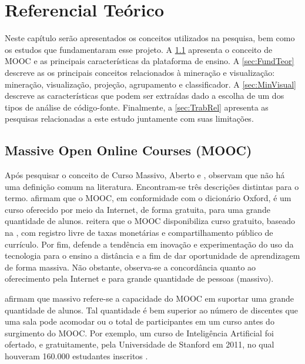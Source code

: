 \chapter{Referencial Teórico}
\label{chap:Ref}
	Neste capítulo serão apresentados os conceitos utilizados na pesquisa, bem como
	os estudos que fundamentaram esse projeto. A \cref{sec:Mooc} apresenta
	o conceito de MOOC e as principais características da plataforma de ensino.
	A \cref{sec:FundTeor} descreve as os principais conceitos relacionados à
	mineração e visualização: mineração, visualização, projeção, agrupamento e
	classificador. A \cref{sec:MinVisual} descreve as características que
	podem ser extraídas dado a escolha de um dos tipos de análise de código-fonte.
	Finalmente, a \cref{sec:TrabRel} apresenta as pesquisas relacionadas a este estudo
	juntamente com suas limitações.

	\section{Massive Open Online Courses (MOOC)}
	\label{sec:Mooc}
		Após pesquisar o conceito de Curso Massivo, Aberto e ,
		 observam que não há uma definição comum na
		literatura. Encontram-se três descrições distintas para o termo.
		 afirmam que o MOOC, em conformidade com o
		dicionário Oxford, é um curso oferecido por meio da Internet, de forma
		gratuita, para uma grande quantidade de alunos. 
		reitera que o MOOC disponibiliza curso gratuito, baseado na ,
		com registro livre de taxas monetárias e compartilhamento público de
		currículo. Por fim,  defende a tendência em inovação e
		experimentação do uso da tecnologia para o ensino a distância e
		 a fim de dar oportunidade de aprendizagem de forma massiva.
		Não obstante, observa-se a concordância quanto ao oferecimento pela Internet
		e para grande quantidade de pessoas (massivo).
		
		 afirmam que massivo refere-se a capacidade do MOOC em
		suportar uma grande quantidade de alunos. Tal quantidade é bem superior
		ao número de discentes que uma sala pode acomodar ou o total de
		participantes em um curso  antes do surgimento do MOOC.
		Por exemplo, um curso de Inteligência Artificial foi ofertado, 
		e gratuitamente, pela Universidade de Stanford em 2011, no qual houveram
		160.000 estudantes inscritos \cite{rodriguez2012}.
		
